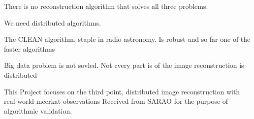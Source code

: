 There is no reconstruction algorithm that solves all three problems. 

We need distributed algorithms.

The CLEAN algorithm, staple in radio astronomy.
Is robust and so far one of the faster algorithms

Big data problem is not sovled. Not every part is of the image reconstruction is distributed


This Project focuses on the third point, distributed image reconstruction with real-world meerkat observations
Received from SARAO for the purpose of algorithmic validation.

